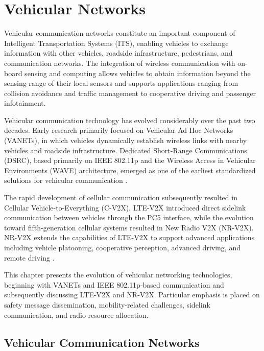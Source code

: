 \chapter{Vehicular Networks}
\label{sec:chapter9}

Vehicular communication networks constitute an important component of
Intelligent Transportation Systems (ITS), enabling vehicles to exchange
information with other vehicles, roadside infrastructure, pedestrians, and
communication networks. The integration of wireless communication with
on-board sensing and computing allows vehicles to obtain information beyond
the sensing range of their local sensors and supports applications ranging
from collision avoidance and traffic management to cooperative driving and
passenger infotainment.

Vehicular communication technology has evolved considerably over the past
two decades. Early research primarily focused on Vehicular Ad Hoc Networks
(VANETs), in which vehicles dynamically establish wireless links with nearby
vehicles and roadside infrastructure. Dedicated Short-Range Communications
(DSRC), based primarily on IEEE 802.11p and the Wireless Access in Vehicular
Environments (WAVE) architecture, emerged as one of the earliest standardized
solutions for vehicular communication
\cite{kenney2011dsrc,jiang2008ieee,morgan2010dsrc}.

The rapid development of cellular communication subsequently resulted in
Cellular Vehicle-to-Everything (C-V2X). LTE-V2X introduced direct sidelink
communication between vehicles through the PC5 interface, while the evolution
toward fifth-generation cellular systems resulted in New Radio V2X
(NR-V2X). NR-V2X extends the capabilities of LTE-V2X to support advanced
applications including vehicle platooning, cooperative perception, advanced
driving, and remote driving
\cite{seo2016lte,molinamasegosa2017ltev,lien2020nr}.

This chapter presents the evolution of vehicular networking technologies,
beginning with VANETs and IEEE 802.11p-based communication and subsequently
discussing LTE-V2X and NR-V2X. Particular emphasis is placed on safety
message dissemination, mobility-related challenges, sidelink communication,
and radio resource allocation.

\section{Vehicular Communication Networks}
\label{sec:vehicular_communication_networks}

